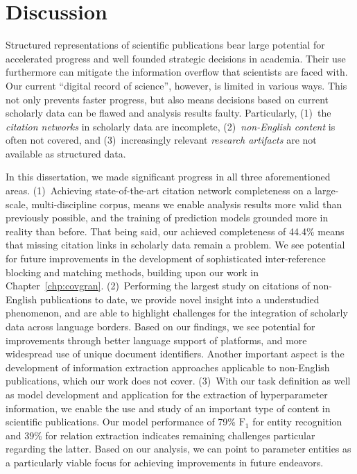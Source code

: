 \section{Discussion}

Structured representations of scientific publications bear large potential for accelerated progress and well founded strategic decisions in academia. Their use furthermore can mitigate the information overflow that scientists are faced with.
Our current ``digital record of science'', however, is limited in various ways. This not only prevents faster progress, but also means decisions based on current scholarly data can be flawed and analysis results faulty.
Particularly, (1)~the \emph{citation networks} in scholarly data are incomplete, (2)~\emph{non-English content} is often not covered, and (3)~increasingly relevant \emph{research artifacts} are not available as structured data.

In this dissertation, we made significant progress in all three aforementioned areas.
%
(1)~Achieving state-of-the-art citation network completeness on a large-scale, multi-discipline corpus,
means we enable analysis results more valid than previously possible, and the training of prediction models grounded more in reality than before.
That being said, our achieved completeness of 44.4\% means that missing citation links in scholarly data remain a problem.
We see potential for future improvements in the development of sophisticated inter-reference blocking and matching methods, building upon our work in Chapter~\ref{chp:covgran}.
%
(2)~Performing the largest study on citations of non-English publications to date,
we provide novel insight into a understudied phenomenon, and are able to highlight challenges for the integration of scholarly data across language borders.
Based on our findings, we see potential for improvements through better language support of platforms, and more widespread use of unique document identifiers. Another important aspect is the development of information extraction approaches applicable to non-English publications, which our work does not cover.
%
(3)~With our task definition as well as model development and application for the extraction of hyperparameter information,
we enable the use and study of an important type of content in scientific publications.
Our model performance of 79\% $\text{F}_1$ for entity recognition and 39\% for relation extraction indicates remaining challenges particular regarding the latter.
Based on our analysis, we can point to parameter entities as a particularly viable focus for achieving improvements in future endeavors.

